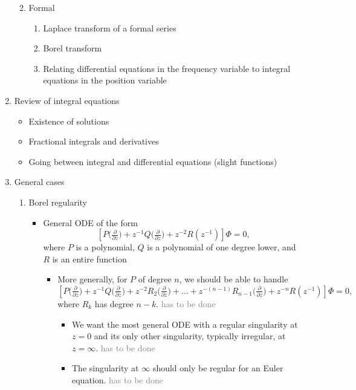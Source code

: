 \documentclass{article}
\theoremstyle{definition}
\begin{document}
\begin{enumerate}
\begin{enumerate}
\begin{enumerate}
\end{enumerate}
\item Formal
\begin{enumerate}
\item Laplace transform of a formal series
\item Borel transform
\item Relating differential equations in the frequency variable to integral equations in the position variable
\end{enumerate}
\end{enumerate}
\item Review of integral equations
\begin{itemize}
\item Existence of solutions
\item Fractional integrals and derivatives
\item Going between integral and differential equations (slight functions)
\end{itemize}
\item General cases
\begin{enumerate}
\item Borel regularity
\begin{itemize}
\item General ODE of the form
\[ \left[ P\big(\tfrac{\partial}{\partial z}\big) + z^{-1} Q\big(\tfrac{\partial}{\partial z}\big) + z^{-2} R(z^{-1}) \right] \Phi = 0, \]
where $P$ is a polynomial, $Q$ is a polynomial of one degree lower, and $R$ is an entire function~
\begin{itemize}
\color{DarkCyan}
\item More generally, for $P$ of degree $n$, we should be able to handle
\[ \left[ P\big(\tfrac{\partial}{\partial z}\big) + z^{-1} Q\big(\tfrac{\partial}{\partial z}\big) + z^{-2} R_2\big(\tfrac{\partial}{\partial z}\big) + \ldots + z^{-(n-1)} R_{n-1}\big(\tfrac{\partial}{\partial z}\big) + z^{-n} R(z^{-1}) \right] \Phi = 0, \]
where $R_k$ has degree $n-k$. \textcolor{gray}{has to be done}
\begin{itemize}
\item We want the most general ODE with a regular singularity at $z = 0$ and its only other singularity, typically irregular, at $z = \infty$. \textcolor{gray}{has to be done}
\item The singularity at $\infty$ should only be regular for an Euler equation. \textcolor{gray}{has to be done}
\end{itemize}

\end{itemize}
\end{itemize}
\end{enumerate}
\end{enumerate}
\end{document}
